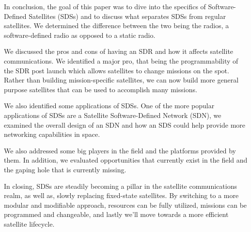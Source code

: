 \documentclass[../main.tex]{subfiles}
\begin{document}
In conclusion, the goal of this paper was to dive into the specifics of Software-Defined Satellites (SDSs) and to discuss what separates SDSs from regular satellites. We determined the difference between the two being the radios, a software-defined radio as opposed to a static radio.

We discussed the pros and cons of having an SDR and how it affects satellite communications. We identified a major pro, that being the programmability of the SDR post launch which allows satellites to change missions on the spot. Rather than building mission-specific satellites, we can now build more general purpose satellites that can be used to accomplish many missions.

We also identified some applications of SDSs. One of the more popular applications of SDSs are a Satellite Software-Defined Network (SDN), we examined the overall design of an SDN and how an SDS could help provide more networking capabilities in space.

We also addressed some big players in the field and the platforms provided by them. In addition, we evaluated opportunities that currently exist in the field and the gaping hole that is currently missing. 

In closing, SDSs are steadily becoming a pillar in the satellite communications realm, as well as, slowly replacing fixed-state satellites. By switching to a more modular and modifiable approach, resources can be fully utilized, missions can be programmed and changeable, and lastly we'll move towards a more efficient satellite lifecycle.
\end{document}
